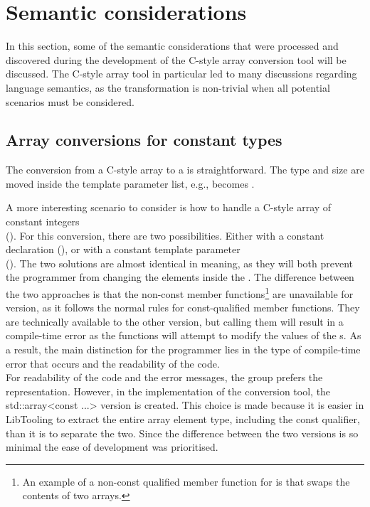 
\section{Semantic considerations}
In this section, some of the semantic considerations that were processed and discovered during the development of the C-style array conversion tool will be discussed.
The C-style array tool in particular led to many discussions regarding language semantics, as the transformation is non-trivial when all potential scenarios must be considered.

\subsection{Array conversions for constant types} \label{subsec:095:030:array_conversions}

The conversion from a C-style  array to a  is straightforward. The type and size are moved inside the template parameter list, e.g.,  becomes .

A more interesting scenario to consider is how to handle a C-style array of constant integers\\
(). For this conversion, there are two possibilities. Either with a constant  declaration
(), or with a constant template parameter\\
().
The two solutions are almost identical in meaning, as they will both prevent the programmer from changing the elements inside the .
The difference between the two approaches is that the non-const member functions\footnote{
    An example of a non-const qualified member function for  is  that swaps the contents of two arrays.
} are unavailable for  version, as it follows the normal rules for const-qualified member functions.
They are technically available to the other version, but calling them will result in a compile-time error as the functions will attempt to modify the values of the s.
As a result, the main distinction for the programmer lies in the type of compile-time error that occurs and the readability of the code.\\
For readability of the code and the error messages, the group prefers the  representation.
However, in the implementation of the conversion tool, the std::array<const ...> version is created. This choice is made because it is easier in LibTooling to extract the entire array element type, including the const qualifier, than it is to separate the two.
Since the difference between the two versions is so minimal the ease of development was prioritised.

